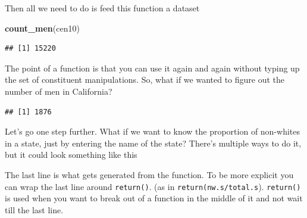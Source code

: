 \documentclass[]{book}
\newenvironment{Shaded}{\begin{snugshade}}{\end{snugshade}}
\newcommand{\KeywordTok}[1]{\textcolor[rgb]{0.13,0.29,0.53}{\textbf{#1}}}
\newcommand{\StringTok}[1]{\textcolor[rgb]{0.31,0.60,0.02}{#1}}
\newcommand{\ControlFlowTok}[1]{\textcolor[rgb]{0.13,0.29,0.53}{\textbf{#1}}}
\newcommand{\OperatorTok}[1]{\textcolor[rgb]{0.81,0.36,0.00}{\textbf{#1}}}
\newcommand{\NormalTok}[1]{#1}
\theoremstyle{definition}
\theoremstyle{definition}
\theoremstyle{definition}
\theoremstyle{remark}
\begin{document}
Then all we need to do is feed this function a dataset

\begin{Shaded}
\begin{Highlighting}[]
\KeywordTok{count_men}\NormalTok{(cen10)}
\end{Highlighting}
\end{Shaded}

\begin{verbatim}
## [1] 15220
\end{verbatim}

The point of a function is that you can use it again and again without
typing up the set of constituent manipulations. So, what if we wanted to
figure out the number of men in California?

\begin{Shaded}
\end{Shaded}

\begin{verbatim}
## [1] 1876
\end{verbatim}

Let's go one step further. What if we want to know the proportion of
non-whites in a state, just by entering the name of the state? There's
multiple ways to do it, but it could look something like this

\begin{Shaded}
\end{Shaded}

The last line is what gets generated from the function. To be more
explicit you can wrap the last line around \texttt{return()}. (as in
\texttt{return(nw.s/total.s}). \texttt{return()} is used when you want
to break out of a function in the middle of it and not wait till the
last line.
\end{document}
